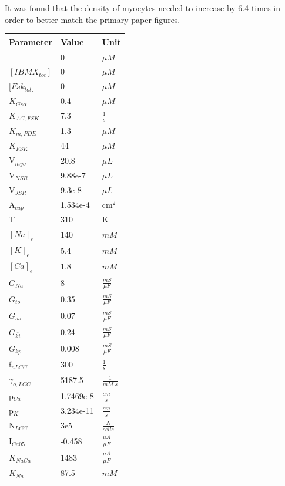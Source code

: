 \documentclass[fleqn,10pt]{physiome}
\begin{document}
It was found that the density of myocytes needed to increase by 6.4 times in order to better match the primary paper figures.

\iffalse
    \begin{table}[]
        \centering
    \begin{tabular}{|l|l|l|}
    \hline
    Parameter & Value & Unit \\ 
    \hline
    [Iso] & 0 & $\mu M$ \\ 
    $[IBMX_{tot}]$ & 0 & $\mu M$ \\ 
    $[Fsk_{tot}$] & 0 & $\mu M$ \\ 
    $K_{Gs\alpha }$ & 0.4 & $\mu M$ \\ 
    $K_{AC,FSK}$ & 7.3 & $\frac{1}{s}$ \\ 
    $K_{m,PDE}$ & 1.3 & $\mu M$ \\ 
    $K_{FSK}$ & 44 & $\mu M$ \\ 
    V$_{myo}$ & 20.8 & $\mu L$ \\ 
    V$_{NSR}$ & 9.88e-7 & $\mu L$ \\ 
    V$_{JSR}$ & 9.3e-8 & $\mu L$ \\ 
    A$_{cap}$ & 1.534e-4 & cm$^2$ \\ 
    T & 310 & K \\ 
    $[Na]_e$ & 140 & $mM$ \\ 
    $[K]_e$ & 5.4 & $mM$ \\ 
    $[Ca]_e$ & 1.8 & $mM$ \\ 
    $G_{Na}$ & 8 & $\frac{mS}{\mu F}$ \\ 
    $G_{to}$ & 0.35 & $\frac{mS}{\mu F}$ \\ 
    $G_{ss}$ & 0.07 & $\frac{mS}{\mu F}$ \\ 
    $G_{\bar{ki}}$ & 0.24 & $\frac{mS}{\mu F}$ \\ 
    $G_{kp}$ & 0.008 & $\frac{mS}{\mu F}$ \\ 
    f$_{nLCC}$ & 300 & $\frac{1}{s}$ \\ 
    $\gamma_{o,LCC}$ & 5187.5 & $\frac{1}{mM.s}$ \\ 
    p$_{Ca}$ & 1.7469e-8 & $\frac{cm}{s}$ \\ 
    p$_{K}$ & 3.234e-11 & $\frac{cm}{s}$ \\ 
    N$_{LCC}$ & 3e5 & $\frac{N}{cells}$ \\ 
    I$_{Ca05}$ & -0.458 & $\frac{\mu A}{\mu F}$ \\ 
    $K_{NaCa}$ & 1483 & $\frac{\mu A}{\mu F}$ \\ 
    $K_{Na}$ & 87.5 & $mM$ \\ 

\end{tabular}
\end{table}
\end{document}
